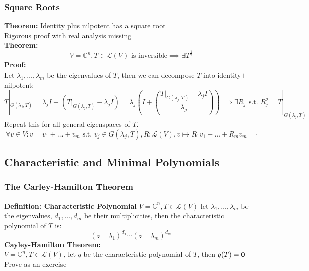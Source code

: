 \documentclass{article}
\newcommand{\st}{\mbox{ s.t. }}
\newcommand{\0}{{\bf{0}}}
\begin{document}
\subsubsection{Square Roots}
\textbf{Theorem:} Identity plus nilpotent has a square root\\
\null\hfill{Rigorous proof with real analysis missing}\\
\textbf{Theorem:}
$$V=\mathbb{C}^n,T\in\mathcal{L}(V)\mbox{ is inversible}\implies\exists T^{\frac{1}{2}}$$
\textbf{Proof:}\\
Let $\lambda_1,\dots,\lambda_m$ be the eigenvalues of $T$, then we can decompose $T$ into identity$+$nilpotent:
$$T|_{G(\lambda_j,T)}=\lambda_jI+\left(T|_{G(\lambda_j,T)}-\lambda_jI\right)=\lambda_j\left(I+\left(\dfrac{T|_{G(\lambda_j,T)}-\lambda_jI}{\lambda_j}\right)\right)\implies\exists R_j\st R_j^2=T|_{G(\lambda_j,T)}$$
Repeat this for all general eigenspaces of $T$.
$$\forall v\in V:v=v_1+\dots+v_m\st v_j\in G(\lambda_j,T),R:\mathcal{L}(V),v\mapsto R_1v_1+\dots+R_mv_m\quad\square$$
\subsection{Characteristic and Minimal Polynomials}
\subsubsection{The Carley-Hamilton Theorem}
\textbf{Definition: Characteristic Polynomial}
$V=\mathbb{C}^n,T\in\mathcal{L}(V)$ let $\lambda_1,\dots,\lambda_m$ be the eigenvalues, $d_1,\dots,d_m$ be their multiplicities, then the characteristic polynomial of $T$ is:
$$(z-\lambda_1)^{d_1}\cdots(z-\lambda_m)^{d_m}$$
\textbf{Cayley-Hamilton Theorem:}\\
$V=\mathbb{C}^n,T\in\mathcal{L}(V)$, let $q$ be the characteristic polynomial of $T$, then $q(T)=\0$\\
\null\hfill{Prove as an exercise}
\end{document}
